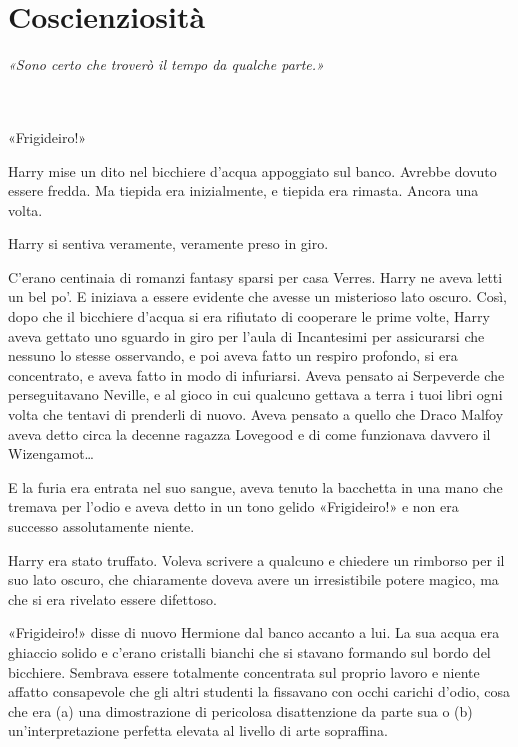 
\chapter{Coscienziosità}
\label{capitolo:15}

\emph{«Sono certo che troverò il tempo da qualche parte.»}

~\\
~\\

«Frigideiro!»

Harry mise un dito nel bicchiere d’acqua appoggiato sul banco. Avrebbe dovuto essere fredda. Ma tiepida era inizialmente, e tiepida era rimasta. Ancora una volta.

Harry si sentiva veramente, veramente preso in giro.

C’erano centinaia di romanzi fantasy sparsi per casa Verres. Harry ne aveva letti un bel po’. E iniziava a essere evidente che avesse un misterioso lato oscuro. Così, dopo che il bicchiere d’acqua si era rifiutato di cooperare le prime volte, Harry aveva gettato uno sguardo in giro per l’aula di Incantesimi per assicurarsi che nessuno lo stesse osservando, e poi aveva fatto un respiro profondo, si era concentrato, e aveva fatto in modo di infuriarsi. Aveva pensato ai Serpeverde che perseguitavano Neville, e al gioco in cui qualcuno gettava a terra i tuoi libri ogni volta che tentavi di prenderli di nuovo. Aveva pensato a quello che Draco Malfoy aveva detto circa la decenne ragazza Lovegood e di come funzionava davvero il Wizengamot…

E la furia era entrata nel suo sangue, aveva tenuto la bacchetta in una mano che tremava per l’odio e aveva detto in un tono gelido «Frigideiro!» e non era successo assolutamente niente.

Harry era stato truffato. Voleva scrivere a qualcuno e chiedere un rimborso per il suo lato oscuro, che chiaramente doveva avere un irresistibile potere magico, ma che si era rivelato essere difettoso.

«Frigideiro!» disse di nuovo Hermione dal banco accanto a lui. La sua acqua era ghiaccio solido e c’erano cristalli bianchi che si stavano formando sul bordo del bicchiere. Sembrava essere totalmente concentrata sul proprio lavoro e niente affatto consapevole che gli altri studenti la fissavano con occhi carichi d’odio, cosa che era (a) una dimostrazione di pericolosa disattenzione da parte sua o (b) un’interpretazione perfetta elevata al livello di arte sopraffina.

